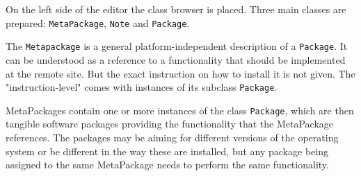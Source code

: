 On the left side of the editor the class browser is placed. Three
main classes are prepared: \texttt{MetaPackage}, \texttt{Note} and
\texttt{Package}.

The \texttt{Metapackage} is a general platform-independent description
of a \texttt{Package}. It can be understood as a reference to a functionality
that should be implemented at the remote site. But the exact instruction
on how to install it is not given.  The "instruction-level" comes with
instances of its subclass \texttt{Package}.

MetaPackages contain one or more instances of the class
\texttt{Package}, which are then tangible software packages providing
the functionality that the MetaPackage references. The packages may
be aiming for different versions of the operating system or be different
in the way these are installed, but any package being assigned to the same
MetaPackage needs to perform the same functionality.
